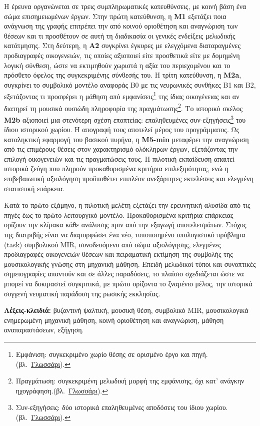 \documentclass[a4paper]{article}
\newcommand{\musnote}[2]{\footnote{#2\enspace(βλ.~\hyperlink{gl:#1}{Γλωσσάρι}).}}
\begin{document}
Η έρευνα οργανώνεται σε τρεις συμπληρωματικές κατευθύνσεις, με κοινή βάση ένα σώμα επισημειωμένων έργων. Στην πρώτη κατεύθυνση, η \textbf{Μ1} εξετάζει ποια ανάγνωση της γραφής επιτρέπει την από κοινού οριοθέτηση και αναγνώριση των θέσεων και τι προσθέτουν σε αυτή τη διαδικασία οι γενικές ενδείξεις μελωδικής κατάτμησης. Στη δεύτερη, η \textbf{Α2} συγκρίνει έγκυρες με ελεγχόμενα διαταραγμένες προδιαγραφές οικογενειών, τις οποίες αξιοποιεί είτε προσθετικά είτε με δομημένη λογική σύνθεση, ώστε να εκτιμηθούν χωριστά η αξία του περιεχομένου και το πρόσθετο όφελος της συγκεκριμένης σύνθεσής του. Η τρίτη κατεύθυνση, η \textbf{Μ2a}, συγκρίνει το συμβολικό μοντέλο αναφοράς B0 με τις νευρωνικές συνθήκες B1 και B2, εξετάζοντας τι προσφέρει η μάθηση από εμφανίσεις\musnote{occurrence}{Εμφάνιση: συγκεκριμένο χωρίο θέσης σε ορισμένο έργο και πηγή.} της ίδιας οικογένειας και αν διατηρεί τη μουσικά ουσιώδη πληροφορία της πραγμάτωσης\musnote{realization}{Πραγμάτωση: συγκεκριμένη μελωδική μορφή της εμφάνισης, όχι κατ’ ανάγκην ηχογράφηση.}. Το ιστορικό σκέλος \textbf{Μ2b} αξιοποιεί μια στενότερη σχέση εποπτείας: επαληθευμένες συν-εξηγήσεις\musnote{coexegesis}{Συν-εξηγήσεις: δύο ιστορικά επαληθευμένες αποδόσεις του ίδιου χωρίου.} του ίδιου ιστορικού χωρίου. Η απογραφή τους αποτελεί μέρος του προγράμματος. Ως καταληκτική εφαρμογή του βασικού πυρήνα, η \textbf{Μ5-min} μεταφέρει την αναγνώριση από τις επιμέρους θέσεις στον χαρακτηρισμό ολόκληρων έργων, εξετάζοντας την επιλογή οικογενειών και τις πραγματώσεις τους. Η πιλοτική εκπαίδευση απαιτεί ιστορικά ζεύγη που πληρούν προκαθορισμένα κριτήρια επιλεξιμότητας, ενώ η επιβεβαιωτική αξιολόγηση προϋποθέτει επιπλέον ανεξάρτητες εκτελέσεις και ελεγμένη στατιστική επάρκεια.

Κατά το πρώτο εξάμηνο, η πιλοτική μελέτη εξετάζει την ερευνητική αλυσίδα από τις πηγές έως το πρώτο λειτουργικό μοντέλο. Προκαθορισμένα κριτήρια επάρκειας ορίζουν την κλίμακα κάθε ανάλυσης πριν από την εξαγωγή αποτελεσμάτων. Στόχος της διατριβής είναι να διαμορφώσει ένα νέο, τυποποιημένο υπολογιστικό πρόβλημα (task) συμβολικού MIR, συνοδευόμενο από σώμα αξιολόγησης, ελεγμένες προδιαγραφές οικογενειών θέσεων και πειραματική εκτίμηση της συμβολής της μουσικολογικής γνώσης στη μηχανική μάθηση. Επειδή μελωδικοί τύποι και συνοπτικές σημειογραφίες απαντούν και σε άλλες παραδόσεις, το πλαίσιο σχεδιάζεται ώστε να μπορεί να δοκιμαστεί συγκριτικά, με πρώτο ορίζοντα το ζναμένιο μέλος, την ιστορικά συγγενή νευματική παράδοση της ρωσικής εκκλησίας.

\smallskip\noindent\textbf{Λέξεις-κλειδιά:} βυζαντινή ψαλτική, μουσική θέση, συμβολικό MIR, μουσικολογικά ενημερωμένη μηχανική μάθηση, κοινή οριοθέτηση και αναγνώριση, μάθηση αναπαραστάσεων, εξήγηση.
\end{document}
